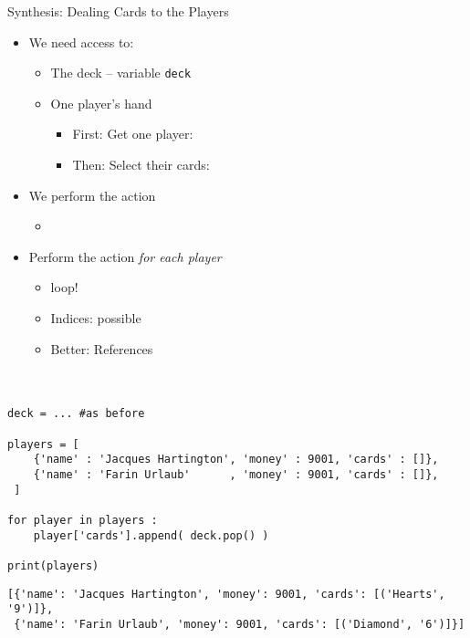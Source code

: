 
\begin{frame}[fragile]{Synthesis: Dealing Cards to the Players}
%
\begin{itemize}
\item We need access to:
	\begin{itemize}
	\item The deck -- variable \texttt{deck}
	\item One player's hand
		\begin{itemize}
		\item First: Get one player: 
		\item Then: Select their cards: 
		\end{itemize}
	\end{itemize}
\item We perform the action
	\begin{itemize}
	\item {}
	\end{itemize}
\item Perform the action \emph{for each player}
	\begin{itemize}
	\item {} loop!
	\item Indices: possible\\
	\item Better: References\\
		\\
		~~~~ 
	\end{itemize}
\end{itemize}
%
\end{frame}


\begin{frame}[fragile]
%
\begin{codebox}
\begin{verbatim}
deck = ... #as before

players = [
    {'name' : 'Jacques Hartington', 'money' : 9001, 'cards' : []},
    {'name' : 'Farin Urlaub'      , 'money' : 9001, 'cards' : []},
 ]

for player in players :
    player['cards'].append( deck.pop() )

print(players)
\end{verbatim}
\end{codebox}
%
\begin{cmdbox}
\begin{verbatim}
[{'name': 'Jacques Hartington', 'money': 9001, 'cards': [('Hearts', '9')]},
 {'name': 'Farin Urlaub', 'money': 9001, 'cards': [('Diamond', '6')]}]
\end{verbatim}
\end{cmdbox}
%
\end{frame}

